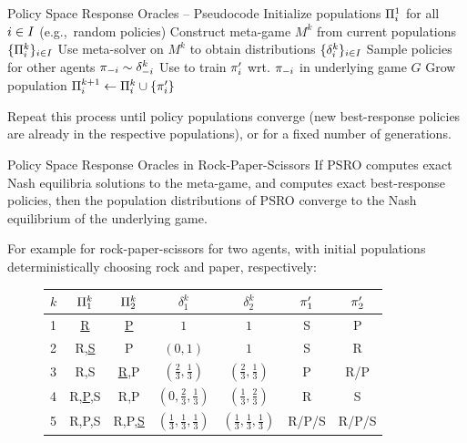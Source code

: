 \begin{frame}[t]{Policy Space Response Oracles -- Pseudocode}
        \State Initialize populations $\Pi_i^1$ for all $i \in I$ (e.g.,\ random policies)
                \State Construct meta-game $M^k$ from current populations $\{ \Pi_i^k \}_{i \in I}$
                \State Use meta-solver on $M^k$ to obtain distributions $\{ \delta_i^k \}_{i \in I}$
                  \label{alg:psro-br-loop}
                                \State Sample policies for other agents $\pi_{-i} \sim \delta_{-i}^k$
                                \State Use \sa\rl to train $\pi'_i$ wrt. $\pi_{-i}$ in underlying game $G$
                        \EndFor
                        \State Grow population $\Pi_i^{k+1} \gets \Pi_i^k \cup \{ \pi'_i \}$
                \EndFor
        \EndFor
    \ealg

    \vspace{-1em}

    \pause
    Repeat this process until policy populations converge (new best-response policies are already in the respective populations), or for a fixed number of generations.
\end{frame}

\begin{frame}[t]{Policy Space Response Oracles in Rock-Paper-Scissors}
    If PSRO computes exact Nash equilibria solutions to the meta-game, and computes exact best-response policies, then the population distributions of PSRO converge to the Nash equilibrium of the underlying game.

    \pause

    For example for rock-paper-scissors for two agents, with initial populations deterministically choosing rock and paper, respectively:
    \begin{figure}[t]
	\centering
	\begin{tabular}{ p{1em} c c c c c c }
		\toprule
		$k$ & $\Pi_1^k$ & $\Pi_2^k$ & $\delta_1^k$ & $\delta_2^k$ & $\pi'_1$ & $\pi'_2$ \\
		\midrule
		1 & \ul{R} & \ul{P} & $1$ & $1$ & S & P \\
		2 & R,\ul{S} & P & $(0,1)$ & $1$ & S & R \\
		3 & R,S & \ul{R},P & $(\frac{2}{3},\frac{1}{3})$ & $(\frac{2}{3},\frac{1}{3})$ & P & R/P \\
		4 & R,\ul{P},S & R,P & $(0,\frac{2}{3},\frac{1}{3})$ & $(\frac{1}{3},\frac{2}{3})$ & R & S \\
		5 & R,P,S & R,P,\ul{S} & $(\frac{1}{3},\frac{1}{3},\frac{1}{3})$ & $(\frac{1}{3},\frac{1}{3},\frac{1}{3})$ & R/P/S & R/P/S \\
		\bottomrule
	\end{tabular}
    \end{figure}
\end{frame}

